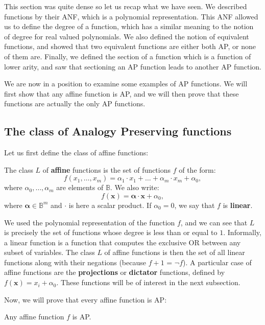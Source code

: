 This section was quite dense so let us recap what we have seen. We
described functions by their ANF, which is a polynomial representation. This ANF
allowed us to define the degree of a function, which has a similar meaning to
the notion of degree for real valued polynomials. We also defined the notion of
equivalent functions, and showed that two equivalent functions are either both
AP, or none of them are. Finally, we defined the section of a function which is
a function of lower arity, and saw that sectioning an AP function leads to
another AP function.

We are now in a position to examine some examples of AP functions. We will first
show that any affine function is AP, and we will then prove that these
functions are actually the only AP functions.

\subsection{The class of Analogy Preserving functions}
\label{SEC:the_class_of_AP_functions}

Let us first define the class of affine functions:
\begin{definition}
  The class $L$ of \textbf{affine} functions is the set of functions $f$ of the
  form:
  $$f(x_1,\ldots , x_m)=\alpha_1\cdot x_1+\ldots +\alpha_m\cdot
  x_m+\alpha_0,$$
  where $\alpha_0,\ldots, \alpha_m$ are elements of $\mathbb{B}$. We also
  write:
  $$f(\mathbf{x}) = \boldsymbol{\alpha} \cdot \mathbf{x} + \alpha_0,$$
  where $\boldsymbol{\alpha} \in \mathbb{B}^m$ and $\cdot$ is here a scalar
  product.  If $\alpha_0= 0$, we say that $f$ is \textbf{linear}.
\end{definition}

We used the polynomial representation of the function $f$, and we can see that
$L$ is precisely the set of functions whose degree is less than or equal to
$1$. Informally, a linear function is a function that computes the exclusive OR
between any subset of variables. The class $L$ of affine functions is then the set of all linear
functions along with their negations (because $f + 1$ = $\neg f$). A particular
case of affine functions are the \textbf{projections} or \textbf{dictator}
functions, defined by $f(\mathbf{x}) = x_i + \alpha_0$. These functions will be
of interest in the next subsection.

Now, we will prove that every affine function is AP:
\begin{proposition}
  \label{PROPOS:affine_functions_are_ap}
  Any affine function $f$ is AP.
\end{proposition}


